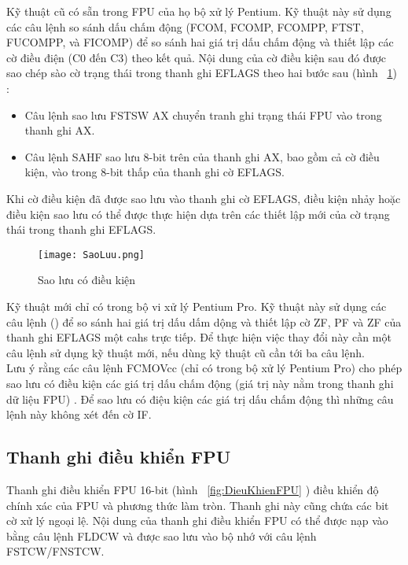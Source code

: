 	Kỹ thuật cũ có sẵn trong FPU của họ bộ xử lý Pentium. Kỹ thuật này sử dụng các câu lệnh so sánh dấu chấm động (FCOM, FCOMP, FCOMPP, FTST, FUCOMPP, và FICOMP) để so sánh hai giá trị dấu chấm động và thiết lập các cờ điều điện (C0 đến C3) theo kết quả. Nội dung của cờ điều kiện sau đó được sao chép sào cờ trạng thái trong thanh ghi EFLAGS theo hai bước sau (hình ~\ref{fig:SaoLuu}) : 
	\begin{itemize}
		\item[1] Câu lệnh sao lưu FSTSW AX chuyển tranh ghi trạng thái FPU vào trong thanh ghi AX.
		\item[2]	Câu lệnh SAHF sao lưu 8-bit trên của thanh ghi AX, bao gồm cả cờ điều kiện, vào trong 8-bit thấp của thanh ghi cờ EFLAGS. 
	\end{itemize}

	Khi cờ điều kiện đã được sao lưu vào thanh ghi cờ EFLAGS, điều kiện nhảy hoặc điều kiện sao lưu có thể được thực hiện dựa trên các thiết lập mới của cờ trạng thái trong thanh ghi EFLAGS.
	\begin{center}
			\begin{figure}[htp]
				\begin{center}
					\texttt{[image: SaoLuu.png]}
				\end{center}
				\caption{Sao lưu có điều kiện}				
				\label{fig:SaoLuu}				
			\end{figure}
		\end{center}	
		
		Kỹ thuật mới chỉ có trong bộ vi xử lý Pentium Pro. Kỹ thuật này sử dụng các câu lệnh () để so sánh hai giá trị dấu dấm dộng và thiết lập cờ ZF, PF và ZF của thanh ghi EFLAGS một cahs trực tiếp. Để thực hiện việc thay đổi này cần một câu lệnh sử dụng kỹ thuật mới, nếu dùng kỹ thuật cũ cần tới ba câu lệnh. \\
		
	Lưu ý rằng các câu lệnh FCMOVcc (chỉ có trong bộ xử lý Pentium Pro) cho phép sao lưu có điều kiện các giá trị dấu chấm động (giá trị này nằm trong thanh ghi dữ liệu FPU) . Để sao lưu có điệu kiện các giá trị dấu chấm động thì những câu lệnh này không xét đến cờ IF.
	
		\subsection*{Thanh ghi điều khiển FPU}
		Thanh ghi điều khiển FPU 16-bit (hình ~\ref{fig:DieuKhienFPU} ) điều khiển độ chính xác của FPU và phương thức làm tròn. Thanh ghi này cũng chứa các bit cờ xử lý ngoại lệ. Nội dung của thanh ghi điều khiển FPU có thể được nạp vào bằng câu lệnh FLDCW và được sao lưu vào bộ nhớ với câu lệnh FSTCW/FNSTCW.\\
		

